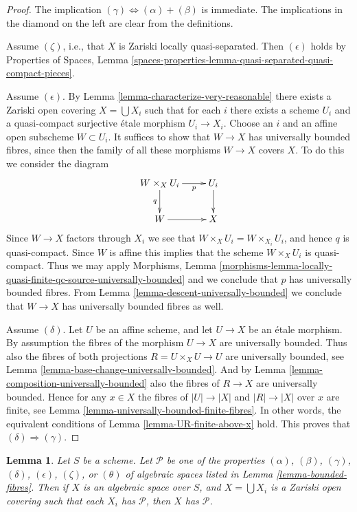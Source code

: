 \documentclass{stacks-project}
\theoremstyle{plain}
\newtheorem{lemma}[subsection]{Lemma}
\theoremstyle{definition}
\theoremstyle{remark}
\numberwithin{equation}{subsection}
\begin{document}
\begin{proof}
The implication $(\gamma) \Leftrightarrow (\alpha) + (\beta)$ is immediate.
The implications in the diamond on the left are clear from the
definitions.

\medskip\noindent
Assume $(\zeta)$, i.e., that $X$ is Zariski locally quasi-separated.
Then $(\epsilon)$ holds by
Properties of Spaces, Lemma
\ref{spaces-properties-lemma-quasi-separated-quasi-compact-pieces}.

\medskip\noindent
Assume $(\epsilon)$. By
Lemma \ref{lemma-characterize-very-reasonable}
there exists
a Zariski open covering $X = \bigcup X_i$ such that for each $i$
there exists a scheme $U_i$ and a quasi-compact surjective \'etale morphism
$U_i \to X_i$. Choose an $i$ and an affine open subscheme $W \subset U_i$.
It suffices to show that $W \to X$ has universally bounded fibres, since then
the family of all these morphisms $W \to X$ covers $X$.
To do this we consider the diagram
$$
\xymatrix{
W \times_X U_i \ar[r]_-p \ar[d]_q & U_i \ar[d] \\
W \ar[r] & X
}
$$
Since $W \to X$ factors through $X_i$ we see that
$W \times_X U_i = W \times_{X_i} U_i$, and hence $q$ is quasi-compact.
Since $W$ is affine this implies that the scheme $W \times_X U_i$
is quasi-compact. Thus we may apply
Morphisms, Lemma
\ref{morphisms-lemma-locally-quasi-finite-qc-source-universally-bounded}
and we conclude that $p$ has universally bounded fibres. From
Lemma \ref{lemma-descent-universally-bounded}
we conclude that $W \to X$ has universally bounded fibres as well.

\medskip\noindent
Assume $(\delta)$. Let $U$ be an affine scheme, and let $U \to X$ be an \'etale
morphism. By assumption the fibres of the morphism $U \to X$ are universally
bounded. Thus also the fibres of both projections $R = U \times_X U \to U$
are universally bounded, see
Lemma \ref{lemma-base-change-universally-bounded}.
And by
Lemma \ref{lemma-composition-universally-bounded}
also the fibres of $R \to X$ are universally bounded.
Hence for any $x \in X$ the fibres of $|U| \to |X|$ and $|R| \to |X|$
over $x$ are finite, see
Lemma \ref{lemma-universally-bounded-finite-fibres}.
In other words, the equivalent conditions of
Lemma \ref{lemma-UR-finite-above-x}
hold. This proves that $(\delta) \Rightarrow (\gamma)$.
\end{proof}

\begin{lemma}
\label{lemma-properties-local}
Let $S$ be a scheme.
Let $\mathcal{P}$ be one of the properties
$(\alpha)$, $(\beta)$, $(\gamma)$, $(\delta)$, $(\epsilon)$, $(\zeta)$, or
$(\theta)$ of algebraic spaces listed in
Lemma \ref{lemma-bounded-fibres}.
Then if $X$ is an algebraic space over $S$, and $X = \bigcup X_i$ is a
Zariski open covering such that each $X_i$ has $\mathcal{P}$,
then $X$ has $\mathcal{P}$.
\end{lemma}
\end{document}
